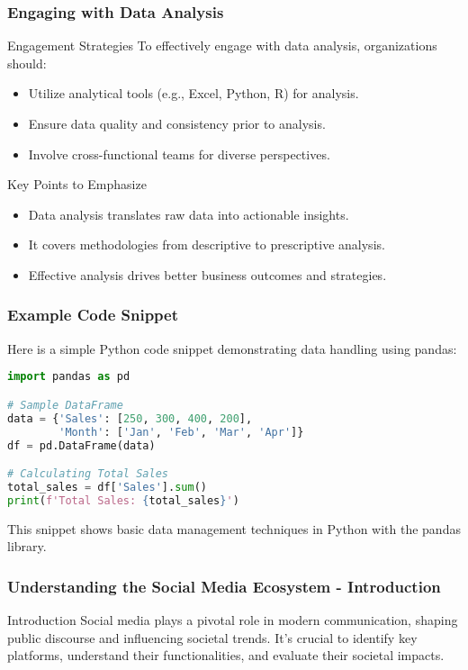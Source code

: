 \documentclass{beamer}
\begin{document}
\begin{frame}[fragile]
    \frametitle{Engaging with Data Analysis}
    \begin{block}{Engagement Strategies}
        To effectively engage with data analysis, organizations should:
    \end{block}
    
    \begin{itemize}
        \item Utilize analytical tools (e.g., Excel, Python, R) for analysis.
        \item Ensure data quality and consistency prior to analysis.
        \item Involve cross-functional teams for diverse perspectives.
    \end{itemize}
    
    \begin{block}{Key Points to Emphasize}
        \begin{itemize}
            \item Data analysis translates raw data into actionable insights.
            \item It covers methodologies from descriptive to prescriptive analysis.
            \item Effective analysis drives better business outcomes and strategies.
        \end{itemize}
    \end{block}
\end{frame}

\begin{frame}[fragile]
    \frametitle{Example Code Snippet}
    Here is a simple Python code snippet demonstrating data handling using pandas:
    \begin{lstlisting}[language=Python]
import pandas as pd

# Sample DataFrame
data = {'Sales': [250, 300, 400, 200],
        'Month': ['Jan', 'Feb', 'Mar', 'Apr']}
df = pd.DataFrame(data)

# Calculating Total Sales
total_sales = df['Sales'].sum()
print(f'Total Sales: {total_sales}')
    \end{lstlisting}
    This snippet shows basic data management techniques in Python with the pandas library.
\end{frame}

\begin{frame}[fragile]
    \frametitle{Understanding the Social Media Ecosystem - Introduction}
    \begin{block}{Introduction}
        Social media plays a pivotal role in modern communication, shaping public discourse and influencing societal trends. 
        It's crucial to identify key platforms, understand their functionalities, and evaluate their societal impacts.
    \end{block}
\end{frame}
\end{document}
